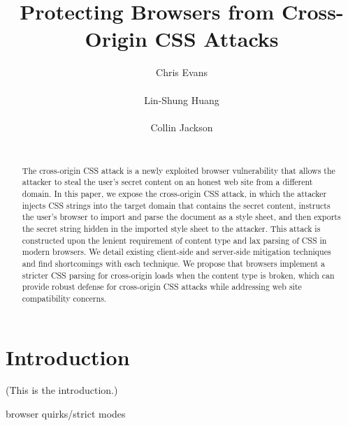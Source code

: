 \documentclass{acm_proc_article-sp}
\begin{document}
\title{Protecting Browsers from Cross-Origin CSS Attacks}

\author{
\alignauthor
Chris Evans\\
      \\
\alignauthor
Lin-Shung Huang\\
      \\
\alignauthor
Collin Jackson\\
      \\
}

\maketitle
\begin{abstract}
The cross-origin CSS attack is a newly exploited browser vulnerability that allows the attacker to steal the user's secret content on an honest web site from a different domain. In this paper, we expose the cross-origin CSS attack, in which the attacker injects CSS strings into the target domain that contains the secret content, instructs the user's browser to import and parse the document as a style sheet, and then exports the secret string hidden in the imported style sheet to the attacker. This attack is constructed upon the lenient requirement of content type and lax parsing of CSS in modern browsers. We detail existing client-side and server-side mitigation techniques and find shortcomings with each technique. We propose that browsers implement a stricter CSS parsing for cross-origin loads when the content type is broken, which can provide robust defense for cross-origin CSS attacks while addressing web site compatibility concerns.
\end{abstract}




\section{Introduction}
(This is the introduction.)

browser quirks/strict modes
\end{document}

